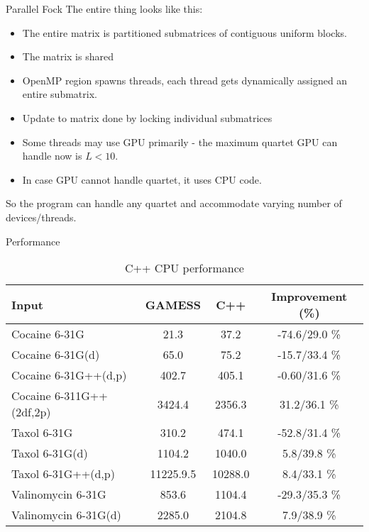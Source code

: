 \documentclass{beamer}
\begin{document}
\begin{frame}{Parallel Fock}
  The entire thing looks like this:
  \begin{itemize}
  \item The entire matrix is partitioned submatrices of contiguous
    uniform blocks.
  \item The matrix is shared
  \item OpenMP region spawns threads, each thread gets dynamically
    assigned an entire submatrix.
  \item Update to matrix done by locking individual submatrices
  \item Some threads may use GPU primarily - the maximum quartet GPU
    can handle now is $L < 10$.
  \item In case GPU cannot handle quartet, it uses CPU code.
  \end{itemize}
  So the program can handle any quartet and accommodate varying number
  of devices/threads.
\end{frame}

\begin{frame}[fragile]{Performance}

\begin{table}
  \label{results1}
  \caption {C++ CPU performance}
  \begin{center}
    \begin{tabular}{| l | c | c | c |}
      \hline
 Input                    & GAMESS & C++ & Improvement (\%) \\
 \hline
 Cocaine 6-31G            & 21.3   & 37.2   & -74.6/29.0 \% \\ 
 Cocaine 6-31G(d)         & 65.0   & 75.2   & -15.7/33.4 \% \\ 
 Cocaine 6-31G++(d,p)     & 402.7  & 405.1  & -0.60/31.6 \% \\ 
 Cocaine 6-311G++(2df,2p) & 3424.4 & 2356.3 &  31.2/36.1 \% \\ 
 \hline
 Taxol 6-31G              & 310.2  & 474.1  &  -52.8/31.4 \% \\
 Taxol 6-31G(d)           & 1104.2 & 1040.0 &    5.8/39.8 \% \\
 Taxol 6-31G++(d,p)       & 11225.9.5 & 10288.0 & 8.4/33.1  \% \\
 \hline
 Valinomycin 6-31G        & 853.6   & 1104.4 & -29.3/35.3 \% \\ 
 Valinomycin 6-31G(d)     & 2285.0  & 2104.8 &   7.9/38.9 \% \\
 \hline
    \end{tabular}
  \end{center}
\end{table}

\end{frame}
\end{document}
